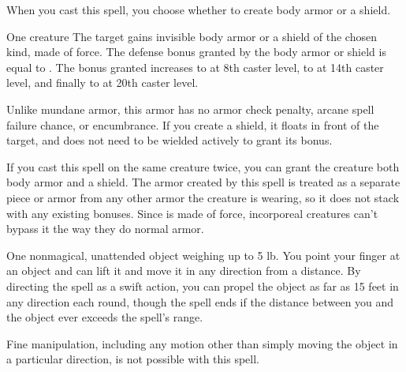 \begin{spellheader}
    \spellrng{\rngclose}
    \spellspecial When you cast this spell, you choose whether to create body armor or a shield.
\end{spellheader}
\begin{spelleffects}
    \begin{spelltarget}{One creature}
        \spelleffect The target gains invisible body armor or a shield of the chosen kind, made of force. The defense bonus granted by the body armor or shield is equal to . The bonus granted increases to  at 8th caster level, to  at 14th caster level, and finally to  at 20th caster level. 
        \par Unlike mundane armor, this armor has no armor check penalty, arcane spell failure chance, or encumbrance. If you create a shield, it floats in front of the target, and does not need to be wielded actively to grant its bonus.
        \spellspecial 
    \end{spelltarget}
\end{spelleffects}
\begin{spellfooter}
    \spellnotes If you cast this spell on the same creature twice, you can grant the creature both body armor and a shield. The armor created by this spell is treated as a separate piece or armor from any other armor the creature is wearing, so it does not stack with any existing bonuses. Since  is made of force, incorporeal creatures can't bypass it the way they do normal armor.
\end{spellfooter}

\begin{spellheader}
    \spellrng{\rngclose}
    \spelldur{\durshort}
\end{spellheader}
\begin{spelleffects}
    \begin{spelltarget}{One nonmagical, unattended object weighing up to 5 lb.}
        \spelleffect You point your finger at an object and can lift it and move it in any direction from a distance. By directing the spell as a swift action, you can propel the object as far as 15 feet in any direction each round, though the spell ends if the distance between you and the object ever exceeds the spell's range.
    \end{spelltarget}
\end{spelleffects}
\begin{spellfooter}
    \spellnotes Fine manipulation, including any motion other than simply moving the object in a particular direction, is not possible with this spell.
\end{spellfooter}

